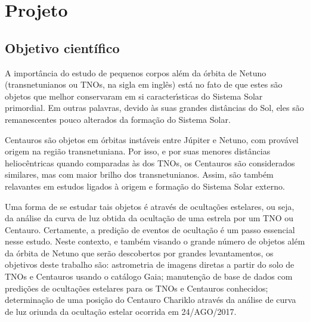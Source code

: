 \documentclass[a4paper, 11pt]{article}
\begin{document}
\renewcommand{\figurename}{\textsc{Figura}}
\renewcommand{\tablename}{\textsc{Tabela}}
\renewcommand{\refname}{Refer\^encias}




\section{Projeto}

\subsection{Objetivo científico}

A importância do estudo de pequenos corpos al\'em da \'orbita de Netuno (transnetunianos ou TNOs, na sigla em ingl\^es) est\'a no fato de que estes s\~ao objetos que melhor conservaram em si caracter\'{\i}sticas do Sistema Solar primordial. Em outras palavras, devido às suas grandes dist\^ancias do Sol, eles s\~ao remanescentes pouco alterados da forma\c c\~ao do Sistema Solar.
% 
% 
% 

Centauros s\~ao objetos em \'orbitas inst\'aveis entre J\'upiter e Netuno, com prov\'avel origem na regi\~ao transnetuniana. Por isso, e por suas menores dist\^ancias helioc\^entricas quando comparadas \`as dos TNOs, os Centauros s\~ao considerados similares, mas com maior brilho dos transnetunianos. Assim, s\~ao tamb\'em relavantes em estudos ligados \`a origem e forma\c c\~ao do Sistema Solar externo.
% 
% 

Uma forma de se estudar tais objetos \'e atrav\'es de oculta\c c\~oes estelares, ou seja, da an\'alise da curva de luz obtida da oculta\c c\~ao de uma estrela por um TNO ou Centauro. Certamente, a predi\c c\~ao de eventos de oculta\c c\~ao \'e um passo essencial nesse estudo. Neste contexto, e tamb\'em visando o grande n\'umero de objetos al\'em da \'orbita de Netuno que ser\~ao descobertos por grandes levantamentos, os objetivos deste trabalho s\~ao: astrometria de imagens diretas a partir do solo de TNOs e Centauros usando o cat\'alogo Gaia; manuten\c c\~ao de base de dados com predi\c c\~oes de oculta\c c\~oes estelares para os TNOs e Centauros conhecidos; determina\c c\~ao de uma posi\c c\~ao do Centauro Chariklo atrav\'es da an\'alise de curva de luz oriunda da  oculta\c c\~ao estelar ocorrida em 24/AGO/2017.
% 
% 
\end{document}
